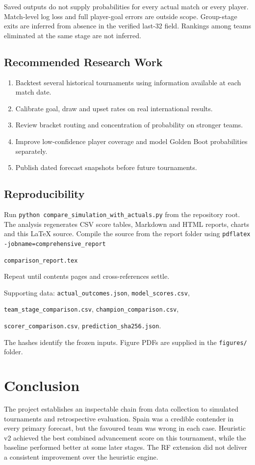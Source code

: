 \documentclass[11pt,a4paper]{article}
\begin{document}
Saved outputs do not supply probabilities for every actual match or every
player. Match-level log loss and full player-goal errors are outside scope.
Group-stage exits are inferred from absence in the verified last-32 field.
Rankings among teams eliminated at the same stage are not inferred.
\clearpage
\subsection{Recommended Research Work}
\begin{enumerate}
\item Backtest several historical tournaments using information available at each match date.
\item Calibrate goal, draw and upset rates on real international results.
\item Review bracket routing and concentration of probability on stronger teams.
\item Improve low-confidence player coverage and model Golden Boot probabilities separately.
\item Publish dated forecast snapshots before future tournaments.
\end{enumerate}
\subsection{Reproducibility}
Run \texttt{python compare\_simulation\_with\_actuals.py} from the repository root.
The analysis regenerates CSV score tables, Markdown and HTML reports, charts
and this LaTeX source. Compile the source from the report folder using
\texttt{pdflatex -jobname=comprehensive\_report}\par
\texttt{comparison\_report.tex}\par
Repeat until contents pages and cross-references settle.

Supporting data: \texttt{actual\_outcomes.json}, \texttt{model\_scores.csv},\par
\texttt{team\_stage\_comparison.csv}, \texttt{champion\_comparison.csv},\par
\texttt{scorer\_comparison.csv}, \texttt{prediction\_sha256.json}.\par
The hashes identify the frozen inputs. Figure PDFs are supplied in the
\texttt{figures/} folder.
\section{Conclusion}
The project establishes an inspectable chain from data collection to simulated
tournaments and retrospective evaluation. Spain was a credible contender in
every primary forecast, but the favoured team was wrong in each case. Heuristic
v2 achieved the best combined advancement score on this tournament, while the
baseline performed better at some later stages. The RF extension did not deliver
a consistent improvement over the heuristic engine.
\end{document}
